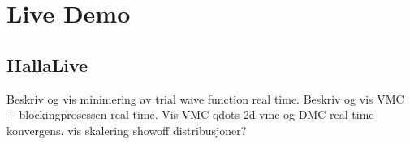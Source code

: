 \section{Live Demo}

\subsection{HallaLive}

\begin{frame}
 Beskriv og vis minimering av trial wave function real time.
 Beskriv og vis VMC + blockingprosessen real-time.
 Vis VMC qdots 2d vmc og DMC real time konvergens.
 vis skalering
 showoff distribusjoner?
\end{frame}